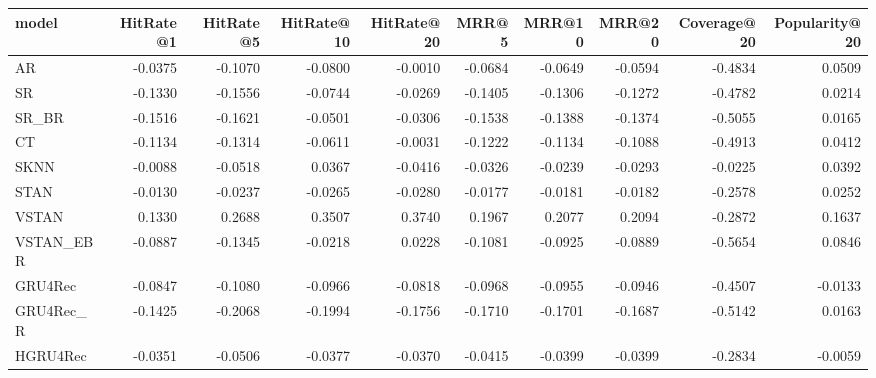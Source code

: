 \begin{tabular}{lrrrrrrrrr}
\toprule
     model &  HitRate@1 &  HitRate@5 &  HitRate@10 &  HitRate@20 &   MRR@5 &  MRR@10 &  MRR@20 &  Coverage@20 &  Popularity@20 \\
\midrule
        AR &    -0.0375 &    -0.1070 &     -0.0800 &     -0.0010 & -0.0684 & -0.0649 & -0.0594 &      -0.4834 &         0.0509 \\
        SR &    -0.1330 &    -0.1556 &     -0.0744 &     -0.0269 & -0.1405 & -0.1306 & -0.1272 &      -0.4782 &         0.0214 \\
     SR\_BR &    -0.1516 &    -0.1621 &     -0.0501 &     -0.0306 & -0.1538 & -0.1388 & -0.1374 &      -0.5055 &         0.0165 \\
        CT &    -0.1134 &    -0.1314 &     -0.0611 &     -0.0031 & -0.1222 & -0.1134 & -0.1088 &      -0.4913 &         0.0412 \\
      SKNN &    -0.0088 &    -0.0518 &      0.0367 &     -0.0416 & -0.0326 & -0.0239 & -0.0293 &      -0.0225 &         0.0392 \\
      STAN &    -0.0130 &    -0.0237 &     -0.0265 &     -0.0280 & -0.0177 & -0.0181 & -0.0182 &      -0.2578 &         0.0252 \\
     VSTAN &     0.1330 &     0.2688 &      0.3507 &      0.3740 &  0.1967 &  0.2077 &  0.2094 &      -0.2872 &         0.1637 \\
 VSTAN\_EBR &    -0.0887 &    -0.1345 &     -0.0218 &      0.0228 & -0.1081 & -0.0925 & -0.0889 &      -0.5654 &         0.0846 \\
   GRU4Rec &    -0.0847 &    -0.1080 &     -0.0966 &     -0.0818 & -0.0968 & -0.0955 & -0.0946 &      -0.4507 &        -0.0133 \\
 GRU4Rec\_R &    -0.1425 &    -0.2068 &     -0.1994 &     -0.1756 & -0.1710 & -0.1701 & -0.1687 &      -0.5142 &         0.0163 \\
  HGRU4Rec &    -0.0351 &    -0.0506 &     -0.0377 &     -0.0370 & -0.0415 & -0.0399 & -0.0399 &      -0.2834 &        -0.0059 \\
\bottomrule
\end{tabular}
